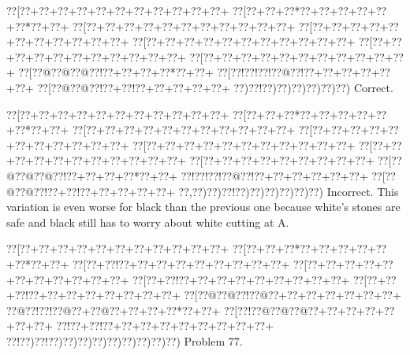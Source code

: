 \documentclass[a5paper]{article}
\begin{document}
\begin{center}
{\goo
\0??[\0??+\0??+\0??+\0??+\0??+\0??+\0??+\0??+\0??+\0??+\0??+
\0??[\0??+\0??+\0??*\0??+\0??+\0??+\0??+\0??+\0??*\0??+\0??+
\0??[\0??+\0??+\0??+\0??+\0??+\0??+\0??+\0??+\0??+\0??+\0??+
\0??[\0??+\0??+\0??+\0??+\0??+\0??+\0??+\0??+\0??+\0??+\0??+
\0??[\0??+\0??+\0??+\0??+\0??+\0??+\0??+\0??+\0??+\0??+\0??+
\0??[\0??+\0??+\0??+\0??+\0??+\0??+\0??+\0??+\0??+\0??+\0??+
\0??[\0??+\0??+\0??+\0??+\0??+\0??+\0??+\0??+\0??+\0??+\0??+
\0??[\0??@\0??@\0??@\0??!\0??+\0??+\0??+\0??*\0??+\0??+
\0??[\0??!\0??!\0??!\0??@\0??!\0??+\0??+\0??+\0??+\0??+\0??+
\0??[\0??@\0??@\0??!\0??+\0??!\0??+\0??+\0??+\0??+\0??+
\0??)\0??!\0??)\0??)\0??)\0??)\0??)\0??)
}
Correct. 

\end{center}
\begin{center}
{\goo
\0??[\0??+\0??+\0??+\0??+\0??+\0??+\0??+\0??+\0??+\0??+\0??+
\0??[\0??+\0??+\0??*\0??+\0??+\0??+\0??+\0??+\0??*\0??+\0??+
\0??[\0??+\0??+\0??+\0??+\0??+\0??+\0??+\0??+\0??+\0??+\0??+
\0??[\0??+\0??+\0??+\0??+\0??+\0??+\0??+\0??+\0??+\0??+\0??+
\0??[\0??+\0??+\0??+\0??+\0??+\0??+\0??+\0??+\0??+\0??+\0??+
\0??[\0??+\0??+\0??+\0??+\0??+\0??+\0??+\0??+\0??+\0??+\0??+
\0??[\0??+\0??+\0??+\0??+\0??+\0??+\0??+\0??+\0??+
\0??[\0??@\0??@\0??@\0??!\0??+\0??+\0??+\0??*\0??+\0??+
\0??!\0??!\0??!\0??@\0??!\0??+\0??+\0??+\0??+\0??+\0??+
\0??[\0??@\0??@\0??!\0??+\0??!\0??+\0??+\0??+\0??+\0??+
\0??,\0??)\0??)\0??!\0??)\0??)\0??)\0??)\0??)\0??)
}
Incorrect. This variation is even worse for black than the previous one because white's stones are safe and black still has to worry about white cutting at A.

\end{center}
\newpage
\begin{center}
{\goo
\0??[\0??+\0??+\0??+\0??+\0??+\0??+\0??+\0??+\0??+\0??+\0??+
\0??[\0??+\0??+\0??*\0??+\0??+\0??+\0??+\0??+\0??*\0??+\0??+
\0??[\0??+\0??!\0??+\0??+\0??+\0??+\0??+\0??+\0??+\0??+\0??+
\0??[\0??+\0??+\0??+\0??+\0??+\0??+\0??+\0??+\0??+\0??+\0??+
\0??[\0??+\0??!\0??+\0??+\0??+\0??+\0??+\0??+\0??+\0??+\0??+
\0??[\0??+\0??+\0??!\0??+\0??+\0??+\0??+\0??+\0??+\0??+\0??+
\0??[\0??@\0??@\0??!\0??@\0??+\0??+\0??+\0??+\0??+\0??+\0??+
\0??@\0??!\0??!\0??@\0??+\0??@\0??+\0??+\0??+\0??*\0??+\0??+
\0??[\0??!\0??@\0??@\0??@\0??+\0??+\0??+\0??+\0??+\0??+\0??+
\0??!\0??+\0??!\0??+\0??+\0??+\0??+\0??+\0??+\0??+\0??+\0??+
\0??!\0??)\0??!\0??)\0??)\0??)\0??)\0??)\0??)\0??)\0??)\0??)
}
Problem 77.

\end{center}
\end{document}
